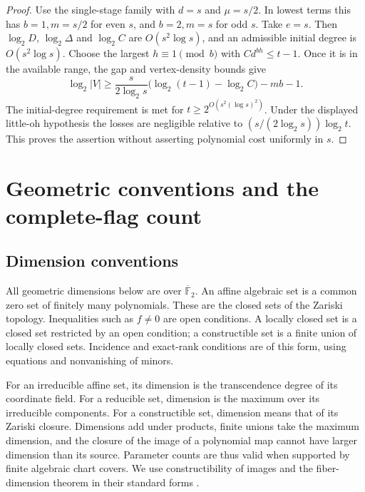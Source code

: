 \documentclass[11pt,a4paper]{article}
\newcommand{\F}{\mathbb F}
\theoremstyle{definition}
\theoremstyle{remark}
\numberwithin{equation}{section}
\begin{document}
\begin{proof}
Use the single-stage family with $d=s$ and $\mu=s/2$. In lowest terms this has $b=1,m=s/2$ for even $s$, and $b=2,m=s$ for odd $s$. Take $e=s$. Then $\log_2D$, $\log_2\Delta$ and $\log_2C$ are $O(s^2\log s)$, and an admissible initial degree is $O(s^2\log s)$. Choose the largest $h\equiv1\pmod b$ with $Cd^{bh}\le t-1$. Once it is in the available range, the gap and vertex-density bounds give
\[
\log_2|V|\ge\frac{s}{2\log_2s}\bigl(\log_2(t-1)-\log_2C\bigr)-mb-1.
\]
The initial-degree requirement is met for $t\ge2^{O(s^2(\log s)^2)}$. Under the displayed little-oh hypothesis the losses are negligible relative to $(s/(2\log_2s))\log_2t$. This proves the assertion without asserting polynomial cost uniformly in $s$.
\end{proof}

\section{Geometric conventions and the complete-flag count}

\subsection{Dimension conventions}
All geometric dimensions below are over $\overline{\F}_2$. An affine algebraic set is a common zero set of finitely many polynomials. These are the closed sets of the Zariski topology. Inequalities such as $f\ne0$ are open conditions. A locally closed set is a closed set restricted by an open condition; a constructible set is a finite union of locally closed sets. Incidence and exact-rank conditions are of this form, using equations and nonvanishing of minors.

For an irreducible affine set, its dimension is the transcendence degree of its coordinate field. For a reducible set, dimension is the maximum over its irreducible components. For a constructible set, dimension means that of its Zariski closure. Dimensions add under products, finite unions take the maximum dimension, and the closure of the image of a polynomial map cannot have larger dimension than its source. Parameter counts are thus valid when supported by finite algebraic chart covers. We use constructibility of images and the fiber-dimension theorem in their standard forms \cite[Chapter I]{Hartshorne}.
\end{document}
